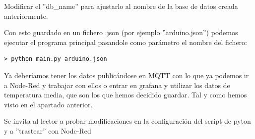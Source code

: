 \documentclass[12pt, a4paper, oneside, titlepage]{article}
\begin{document}
Modificar el ''db\_name'' para ajustarlo al nombre de la base de datos creada anteriormente.

Con esto guardado en un fichero .json (por ejemplo ''arduino.json'') podemos ejecutar el programa principal pasandole como parámetro el nombre del fichero:

\begin{lstlisting}[frame=single]
> python main.py arduino.json
\end{lstlisting}


Ya deberíamos tener los datos publicándose en MQTT con lo que ya podemos ir a Node-Red y trabajar con ellos
o entrar en grafana y utilizar los datos de temperatura media, que son los que hemos decidido guardar. Tal y como hemos visto en el apartado anterior. 

Se invita al lector a probar modificaciones en la configuración del script de pyton y a ''trastear'' con Node-Red  
\end{document}

